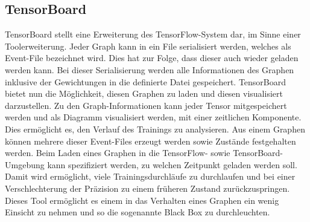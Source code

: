 \subsection{TensorBoard}

TensorBoard stellt eine Erweiterung des TensorFlow-System dar, im Sinne einer Toolerweiterung. 
Jeder Graph kann in ein File serialisiert werden, welches als Event-File bezeichnet wird. 
Dies hat zur Folge, dass dieser auch wieder geladen werden kann. 
Bei dieser Serialisierung werden alle Informationen des Graphen inklusive der Gewichtungen in die definierte Datei gespeichert.
TensorBoard bietet nun die Möglichkeit, diesen Graphen zu laden und diesen visualisiert darzustellen.
Zu den Graph-Informationen kann jeder Tensor mitgespeichert werden und als Diagramm visualisiert werden, mit einer zeitlichen Komponente. 
Dies ermöglicht es, den Verlauf des Trainings zu analysieren. 
Aus einem Graphen können mehrere dieser Event-Files erzeugt werden sowie Zustände festgehalten werden. 
Beim Laden eines Graphen in die TensorFlow- sowie TensorBoard-Umgebung kann spezifiziert werden, zu welchen Zeitpunkt geladen werden soll. 
Damit wird ermöglicht, viele Trainingsdurchläufe zu durchlaufen und bei einer Verschlechterung der Präzision zu einem früheren Zustand zurückzuspringen.
Dieses Tool ermöglicht es einem in das Verhalten eines Graphen ein wenig Einsicht zu nehmen und so die sogenannte Black Box zu durchleuchten. 

